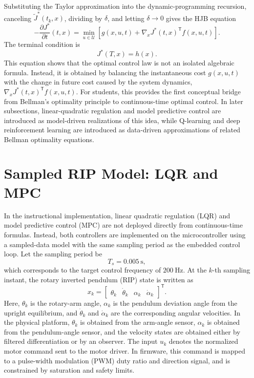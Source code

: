 \documentclass[11pt]{article}
\begin{document}
Substituting the Taylor approximation into the dynamic-programming recursion, canceling $\widetilde{J}^{*}(t_k,x)$, dividing by $\delta$, and letting $\delta\to0$ gives the HJB equation
\begin{equation}
-\frac{\partial J^{*}}{\partial t}(t,x)
=
\min_{u\in\mathcal{U}}
\left[
 g(x,u,t)
 +\nabla_x J^{*}(t,x)^{\mathsf T}f(x,u,t)
\right].
\label{eq:hjb}
\end{equation}
The terminal condition is
\begin{equation}
J^{*}(T,x)=h(x).
\label{eq:hjb_terminal}
\end{equation}
This equation shows that the optimal control law is not an isolated algebraic formula. Instead, it is obtained by balancing the instantaneous cost $g(x,u,t)$ with the change in future cost caused by the system dynamics, $\nabla_xJ^{*}(t,x)^{\mathsf T}f(x,u,t)$. For students, this provides the first conceptual bridge from Bellman's optimality principle to continuous-time optimal control. In later subsections, linear-quadratic regulation and model predictive control are introduced as model-driven realizations of this idea, while Q-learning and deep reinforcement learning are introduced as data-driven approximations of related Bellman optimality equations.

\section{Sampled RIP Model: LQR and MPC}

In the instructional implementation, linear quadratic regulation (LQR) and model predictive control (MPC) are not deployed directly from continuous-time formulas. Instead, both controllers are implemented on the microcontroller using a sampled-data model with the same sampling period as the embedded control loop. Let the sampling period be
\begin{equation}
T_s=0.005~\mathrm{s},
\label{eq:sampling_period}
\end{equation}
which corresponds to the target control frequency of $200~\mathrm{Hz}$. At the $k$-th sampling instant, the rotary inverted pendulum (RIP) state is written as
\begin{equation}
x_k=
\begin{bmatrix}
\theta_k & \dot{\theta}_k & \alpha_k & \dot{\alpha}_k
\end{bmatrix}^{\mathsf T}.
\label{eq:rip_state_sampled}
\end{equation}
Here, $\theta_k$ is the rotary-arm angle, $\alpha_k$ is the pendulum deviation angle from the upright equilibrium, and $\dot{\theta}_k$ and $\dot{\alpha}_k$ are the corresponding angular velocities. In the physical platform, $\theta_k$ is obtained from the arm-angle sensor, $\alpha_k$ is obtained from the pendulum-angle sensor, and the velocity states are obtained either by filtered differentiation or by an observer. The input $u_k$ denotes the normalized motor command sent to the motor driver. In firmware, this command is mapped to a pulse-width modulation (PWM) duty ratio and direction signal, and is constrained by saturation and safety limits.
\end{document}
